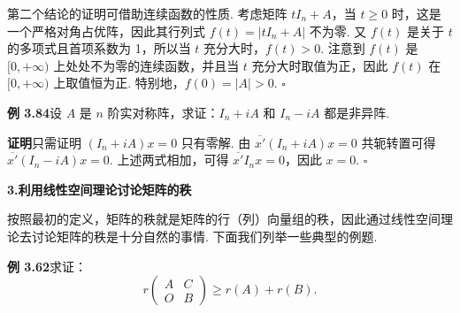 \documentclass[UTF8, 12pt, fontset=fandol, oneside]{ctexart}
\begin{document}
第二个结论的证明可借助连续函数的性质. 考虑矩阵 $tI_n+A$，当 $t\ge 0$ 时，这是一个严格对角占优阵，因此其行列式 $f(t)=|tI_n+A|$ 不为零. 又 $f(t)$ 是关于 $t$ 的多项式且首项系数为 1，所以当 $t$ 充分大时，$f(t)>0$. 注意到 $f(t)$ 是 $[0,+\infty)$ 上处处不为零的连续函数，并且当 $t$ 充分大时取值为正，因此 $f(t)$ 在 $[0,+\infty)$ 上取值恒为正. 特别地，$f(0)=|A|>0$. $\square$

\noindent\textbf{例 3.84}\quad 设 $A$ 是 $n$ 阶实对称阵，求证：$I_n+iA$ 和 $I_n-iA$ 都是非异阵.

\noindent\textbf{证明}\quad 只需证明 $(I_n+iA)x=0$ 只有零解. 由 $\overline{x'}(I_n+iA)x=0$ 共轭转置可得 $\overline{x'}(I_n-iA)x=0$. 上述两式相加，可得 $\overline{x'}I_nx=0$，因此 $x=0$. $\square$

\noindent\textbf{3.\quad 利用线性空间理论讨论矩阵的秩}

按照最初的定义，矩阵的秩就是矩阵的行（列）向量组的秩，因此通过线性空间理论去讨论矩阵的秩是十分自然的事情. 下面我们列举一些典型的例题.

\noindent\textbf{例 3.62}\quad 求证：
\[
r\begin{pmatrix}A&C\\O&B\end{pmatrix}\ge r(A)+r(B).
\]
\end{document}
